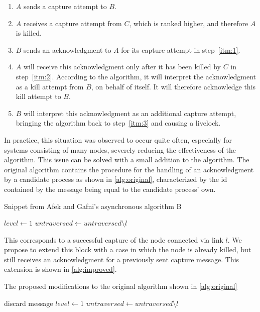 \documentclass{article}
\begin{document}
\begin{enumerate}
	\item \label{itm:1} $A$ sends a capture attempt to $B$.
	\item \label{itm:2} $A$ receives a capture attempt from $C$, which is ranked higher, and therefore $A$ is killed.
	\item \label{itm:3} $B$ sends an acknowledgment to $A$ for its capture attempt in step~\ref{itm:1}.
	\item $A$ will receive this acknowledgment only after it has been killed by $C$ in step~\ref{itm:2}. According to the algorithm, it will interpret the acknowledgment as a kill attempt from $B$, on behalf of itself. It will therefore acknowledge this kill attempt to $B$.
	\item $B$ will interpret this acknowledgment as an additional capture attempt, bringing the algorithm back to step~\ref{itm:3} and causing a livelock.
\end{enumerate}

In practice, this situation was observed to occur quite often, especially for systems consisting of many nodes, severely reducing the effectiveness of the algorithm. This issue can be solved with a small addition to the algorithm. The original algorithm contains the procedure for the handling of an acknowledgment by a candidate process as shown in \cref{alg:original}, characterized by the id contained by the message being equal to the candidate process' own.

\begin{algorithm}
	\caption{Snippet from Afek and Gafni's asynchronous algorithm B}
	\begin{algorithmic}
			\STATE $level \gets 1$
			\STATE $untraversed \gets untraversed \setminus l$
		\ENDIF
	\end{algorithmic}
	\label{alg:original}
\end{algorithm}

This corresponds to a successful capture of the node connected via link $l$. We propose to extend this block with a case in which the node is already killed, but still receives an acknowledgment for a previously sent capture message. This extension is shown in \cref{alg:improved}.

\begin{algorithm}
	\caption{The proposed modifications to the original algorithm shown in \cref{alg:original}}
	\begin{algorithmic}
		\IF{$id' = id$}
			\IF{$killed$}
				\STATE discard message
			\ELSE
				\STATE $level \gets 1$
				\STATE $untraversed \gets untraversed \setminus l$
			\ENDIF
		\ENDIF{}
	\end{algorithmic}
	\label{alg:improved}
\end{algorithm}
\end{document}
